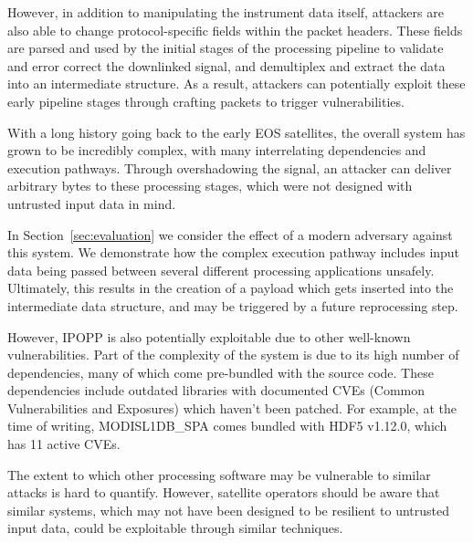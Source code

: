 
However, in addition to manipulating the instrument data itself, attackers are also able to change protocol-specific fields within the packet headers.
These fields are parsed and used by the initial stages of the processing pipeline to validate and error correct the downlinked signal, and demultiplex and extract the data into an intermediate structure.
As a result, attackers can potentially exploit these early pipeline stages through crafting packets to trigger vulnerabilities.

With a long history going back to the early EOS satellites, the overall system has grown to be incredibly complex, with many interrelating dependencies and execution pathways.
Through overshadowing the signal, an attacker can deliver arbitrary bytes to these processing stages, which were not designed with untrusted input data in mind.

In Section~\ref{sec:evaluation} we consider the effect of a modern adversary against this system.
We demonstrate how the complex execution pathway includes input data being passed between several different processing applications unsafely.
Ultimately, this results in the creation of a payload which gets inserted into the intermediate data structure, and may be triggered by a future reprocessing step.

However, IPOPP is also potentially exploitable due to other well-known vulnerabilities.
Part of the complexity of the system is due to its high number of dependencies, many of which come pre-bundled with the source code.
These dependencies include outdated libraries with documented CVEs (Common Vulnerabilities and Exposures) which haven't been patched.
For example, at the time of writing, MODISL1DB\_SPA comes bundled with HDF5 v1.12.0, which has 11 active CVEs.



The extent to which other processing software may be vulnerable to similar attacks is hard to quantify.
However, satellite operators should be aware that similar systems, which may not have been designed to be resilient to untrusted input data, could be exploitable through similar techniques.

